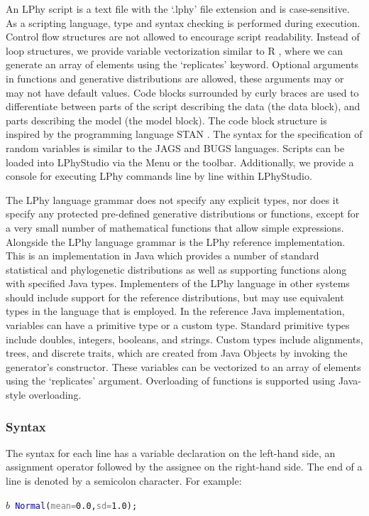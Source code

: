 \documentclass[10pt,letterpaper,table]{article}
\theoremstyle{definition}
\begin{document}
An LPhy script is a text file with the `.lphy' file extension and is case-sensitive. 
As a scripting language, type and syntax checking is performed during execution. 
Control flow structures are not allowed to encourage script readability. 
Instead of loop structures, we provide variable vectorization similar to R \cite{ihaka1996r}, where we can generate an array of elements using the `replicates' keyword. 
Optional arguments in functions and generative distributions are allowed, these arguments may or may not have default values. 
Code blocks surrounded by curly braces are used to differentiate between parts of the script describing the data (the data block), and parts describing the model (the model block). 
The code block structure is inspired by the programming language STAN \cite{carpenter2017stan}. 
The syntax for the specification of random variables is similar to the JAGS \cite{plummer2004jags} and BUGS \cite{lunn2009bugs, gilks1994language} languages. 
Scripts can be loaded into LPhyStudio via the Menu or the toolbar. 
Additionally, we provide a console for executing LPhy commands line by line within LPhyStudio. 

The LPhy language grammar does not specify any explicit types, nor does it specify any protected pre-defined generative distributions or functions, except for a very small number of mathematical functions that allow simple expressions. 
Alongside the LPhy language grammar is the LPhy reference implementation. 
This is an implementation in Java which provides a number of standard statistical and phylogenetic distributions as well as supporting functions along with specified Java types. 
Implementers of the LPhy language in other systems should include support for the reference distributions, but may use equivalent types in the language that is employed.
In the reference Java implementation, variables can have a primitive type or a custom type.  
Standard primitive types include doubles, integers, booleans, and strings. 
Custom types include alignments, trees, and discrete traits, which are created from Java Objects by invoking the generator's constructor. 
These variables can be vectorized to an array of elements using the `replicates' argument. 
Overloading of functions is supported using Java-style overloading. 


\subsubsection{Syntax}
The syntax for each line has a variable declaration on the left-hand side, an assignment operator followed by the assignee on the right-hand side. 
The end of a line is denoted by a semicolon character.
For example: 
{
  \small
  \begin{listing}
    \begin{alltt}
    \textcolor{bluishgreen}{\(b\)}  ~ \textcolor{blue}{Normal}(\textcolor{gray}{mean=} \textcolor{constant}{0.0}, \textcolor{gray}{sd=}\textcolor{constant}{1.0});
    \end{alltt}
  \end{listing}
}
\end{document}
